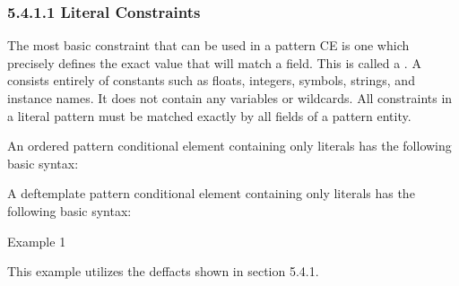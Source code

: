\documentclass[letterpaper,10pt,english]{sphinxmanual}
\begin{document}
\subsubsection{5.4.1.1 Literal Constraints}
\label{\detokenize{defrule:literal-constraints}}
The most basic constraint that can be used in a pattern CE is one which
precisely defines the exact value that will match a field. This is
called a . A  consists
entirely of constants such as floats, integers, symbols, strings, and
instance names. It does not contain any variables or wildcards. All
constraints in a literal pattern must be matched exactly by all fields
of a pattern entity.

An ordered pattern conditional element containing only literals has the
following basic syntax:


\begin{sphinxVerbatim}[commandchars=\\\{\}]
  
\end{sphinxVerbatim}

A deftemplate pattern conditional element containing only literals has
the following basic syntax:

\begin{sphinxVerbatim}[commandchars=\\\{\}]
  
   
\end{sphinxVerbatim}

Example 1

This example utilizes the  deffacts shown in section 5.4.1.
\end{document}

